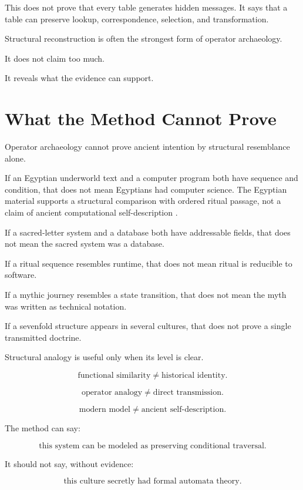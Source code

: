 \documentclass[11pt]{book}
\begin{document}
This does not prove that every table generates hidden messages. It says that a table can preserve lookup, correspondence, selection, and transformation.

Structural reconstruction is often the strongest form of operator archaeology.

It does not claim too much.

It reveals what the evidence can support.

\section{What the Method Cannot Prove}

Operator archaeology cannot prove ancient intention by structural resemblance alone.

If an Egyptian underworld text and a computer program both have sequence and condition, that does not mean Egyptians had computer science. The Egyptian material supports a structural comparison with ordered ritual passage, not a claim of ancient computational self-description \cite{Allen1974BookDead,Hornung1999BooksAfterlife,Hornung1990BookGates}.

If a sacred-letter system and a database both have addressable fields, that does not mean the sacred system was a database.

If a ritual sequence resembles runtime, that does not mean ritual is reducible to software.

If a mythic journey resembles a state transition, that does not mean the myth was written as technical notation.

If a sevenfold structure appears in several cultures, that does not prove a single transmitted doctrine.

Structural analogy is useful only when its level is clear.

\[
\text{functional similarity} \neq \text{historical identity}.
\]

\[
\text{operator analogy} \neq \text{direct transmission}.
\]

\[
\text{modern model} \neq \text{ancient self-description}.
\]

The method can say:

\[
\text{this system can be modeled as preserving conditional traversal}.
\]

It should not say, without evidence:

\[
\text{this culture secretly had formal automata theory}.
\]
\end{document}
